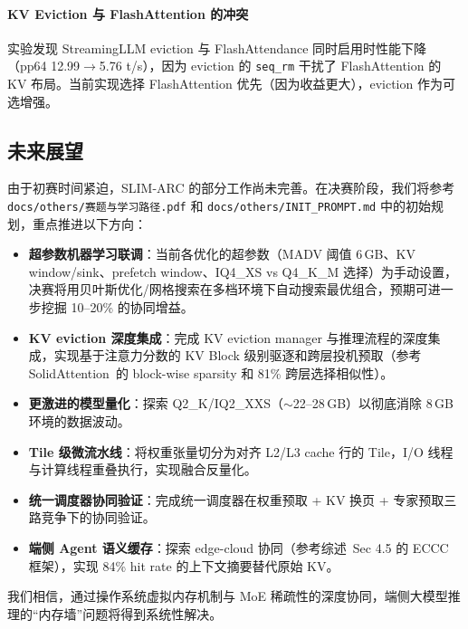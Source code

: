 \paragraph{KV Eviction 与 FlashAttention 的冲突}
实验发现 StreamingLLM eviction 与 FlashAttendance 同时启用时性能下降（pp64 12.99$\to$5.76 t/s），因为 eviction 的 \texttt{seq\_rm} 干扰了 FlashAttention 的 KV 布局。当前实现选择 FlashAttention 优先（因为收益更大），eviction 作为可选增强。

\subsection{未来展望}

由于初赛时间紧迫，SLIM-ARC 的部分工作尚未完善。在决赛阶段，我们将参考 \texttt{docs/others/赛题与学习路径.pdf} 和 \texttt{docs/others/INIT\_PROMPT.md} 中的初始规划，重点推进以下方向：

\begin{itemize}
    \item \textbf{超参数机器学习联调}：当前各优化的超参数（MADV 阈值 6\,GB、KV window/sink、prefetch window、IQ4\_XS vs Q4\_K\_M 选择）为手动设置，决赛将用贝叶斯优化/网格搜索在多档环境下自动搜索最优组合，预期可进一步挖掘 10--20\% 的协同增益。
    \item \textbf{KV eviction 深度集成}：完成 KV eviction manager 与推理流程的深度集成，实现基于注意力分数的 KV Block 级别驱逐和跨层投机预取（参考 SolidAttention~\cite{solidattention2026}的 block-wise sparsity 和 81\% 跨层选择相似性）。
    \item \textbf{更激进的模型量化}：探索 Q2\_K/IQ2\_XXS（$\sim$22--28\,GB）以彻底消除 8\,GB 环境的数据波动。
    \item \textbf{Tile 级微流水线}：将权重张量切分为对齐 L2/L3 cache 行的 Tile，I/O 线程与计算线程重叠执行，实现融合反量化。
    \item \textbf{统一调度器协同验证}：完成统一调度器在权重预取 + KV 换页 + 专家预取三路竞争下的协同验证。
    \item \textbf{端侧 Agent 语义缓存}：探索 edge-cloud 协同（参考综述~\cite{survey2026}Sec 4.5 的 ECCC 框架），实现 84\% hit rate 的上下文摘要替代原始 KV。
\end{itemize}

我们相信，通过操作系统虚拟内存机制与 MoE 稀疏性的深度协同，端侧大模型推理的“内存墙”问题将得到系统性解决。
